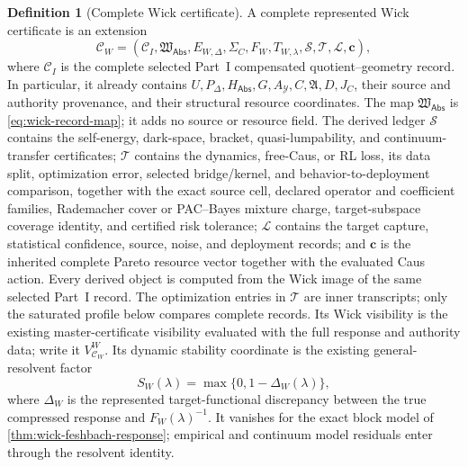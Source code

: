 \documentclass[11pt]{article}
\numberwithin{section}{part}
\theoremstyle{plain}
\theoremstyle{definition}
\newtheorem{definition}[definition]{Definition}
\theoremstyle{remark}
\newcommand{\Abs}{\mathsf{Abs}}
\begin{document}
\begin{definition}[Complete Wick certificate]
\label{def:complete-wick-certificate}
A complete represented Wick certificate is an extension
\[
 \mathscr C_W=
 (\mathscr C_I,\mathfrak W_{\Abs},
 E_{W,\Delta},\Sigma_C,F_W,T_{W,\lambda},
 \mathscr S,\mathscr T,\mathscr L,\mathbf c),
\]
where \(\mathscr C_I\) is the complete selected Part~I compensated
quotient--geometry record.  In particular, it already contains
\(U,P_\Delta,H_{\Abs},G,A_{\mathcal Y},C,\mathfrak A,D,J_C\), their source
and authority provenance, and their structural resource coordinates.  The
map \(\mathfrak W_{\Abs}\) is \eqref{eq:wick-record-map}; it adds no source
or resource field.  The derived ledger \(\mathscr S\) contains the
self-energy, dark-space, bracket,
quasi-lumpability, and continuum-transfer certificates;
\(\mathscr T\) contains the dynamics, free-Caus, or RL loss, its data split,
optimization error, selected bridge/kernel, and behavior-to-deployment
comparison, together with the exact source cell, declared operator and
coefficient families, Rademacher cover or PAC--Bayes mixture charge,
target-subspace coverage identity, and certified risk tolerance;
\(\mathscr L\) contains the target capture, statistical confidence, source,
noise, and deployment records; and \(\mathbf c\) is the inherited complete
Pareto resource vector together with the evaluated Caus action.  Every
derived object is computed from the Wick image of the same selected Part~I
record.  The optimization entries in \(\mathscr T\) are inner transcripts;
only the saturated profile below compares complete records.  Its Wick
visibility is the
existing master-certificate visibility evaluated with the full response and
authority data; write it \(V^W_{\mathscr C_W}\).
Its dynamic stability coordinate is the existing general-resolvent factor
\[
 S_W(\lambda)=\max\{0,1-\Delta_W(\lambda)\},
\]
where \(\Delta_W\) is the represented target-functional discrepancy between
the true compressed response and \(F_W(\lambda)^{-1}\).  It vanishes for the
exact block model of \cref{thm:wick-feshbach-response}; empirical and
continuum model residuals enter through the resolvent identity.


\end{definition}
\end{document}
